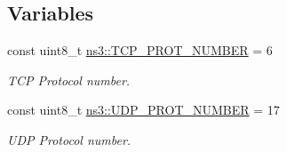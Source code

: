 \subsection*{Variables}
\begin{DoxyCompactItemize}
\item 
const uint8\+\_\+t \hyperlink{namespacens3_a203a34fc0e042720ce1a0a754e270646}{ns3\+::\+T\+C\+P\+\_\+\+P\+R\+O\+T\+\_\+\+N\+U\+M\+B\+ER} = 6
\begin{DoxyCompactList}\small\item\em T\+CP Protocol number. \end{DoxyCompactList}\item 
const uint8\+\_\+t \hyperlink{namespacens3_ae787098cbb0a3e8f6a17d9249e88a77f}{ns3\+::\+U\+D\+P\+\_\+\+P\+R\+O\+T\+\_\+\+N\+U\+M\+B\+ER} = 17
\begin{DoxyCompactList}\small\item\em U\+DP Protocol number. \end{DoxyCompactList}\end{DoxyCompactItemize}
